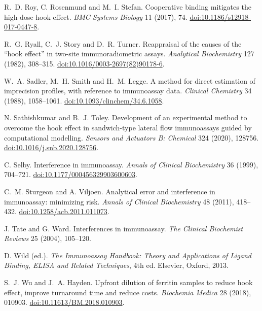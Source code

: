  R.~D. Roy, C. Rosenmund and M.~I. Stefan.
Cooperative binding mitigates the high-dose hook effect.
\emph{BMC Systems Biology} 11 (2017), 74.
\href{https://doi.org/10.1186/s12918-017-0447-8}{doi:10.1186/s12918-017-0447-8}.

 R.~G. Ryall, C.~J. Story and D.~R. Turner.
Reappraisal of the causes of the ``hook effect'' in two-site immunoradiometric assays.
\emph{Analytical Biochemistry} 127 (1982), 308--315.
\href{https://doi.org/10.1016/0003-2697(82)90178-6}{doi:10.1016/0003-2697(82)90178-6}.

 W.~A. Sadler, M.~H. Smith and H.~M. Legge.
A method for direct estimation of imprecision profiles, with reference to immunoassay data.
\emph{Clinical Chemistry} 34 (1988), 1058--1061.
\href{https://doi.org/10.1093/clinchem/34.6.1058}{doi:10.1093/clinchem/34.6.1058}.

 N. Sathishkumar and B.~J. Toley.
Development of an experimental method to overcome the hook effect in sandwich-type lateral flow immunoassays guided by computational modelling.
\emph{Sensors and Actuators B: Chemical} 324 (2020), 128756.
\href{https://doi.org/10.1016/j.snb.2020.128756}{doi:10.1016/j.snb.2020.128756}.

 C. Selby.
Interference in immunoassay.
\emph{Annals of Clinical Biochemistry} 36 (1999), 704--721.
\href{https://doi.org/10.1177/000456329903600603}{doi:10.1177/000456329903600603}.

 C.~M. Sturgeon and A. Viljoen.
Analytical error and interference in immunoassay: minimizing risk.
\emph{Annals of Clinical Biochemistry} 48 (2011), 418--432.
\href{https://doi.org/10.1258/acb.2011.011073}{doi:10.1258/acb.2011.011073}.

 J. Tate and G. Ward.
Interferences in immunoassay.
\emph{The Clinical Biochemist Reviews} 25 (2004), 105--120.

 D. Wild (ed.).
\emph{The Immunoassay Handbook: Theory and Applications of Ligand Binding, ELISA and Related Techniques}, 4th ed.
Elsevier, Oxford, 2013.

 S.~J. Wu and J.~A. Hayden.
Upfront dilution of ferritin samples to reduce hook effect, improve turnaround time and reduce costs.
\emph{Biochemia Medica} 28 (2018), 010903.
\href{https://doi.org/10.11613/BM.2018.010903}{doi:10.11613/BM.2018.010903}.
